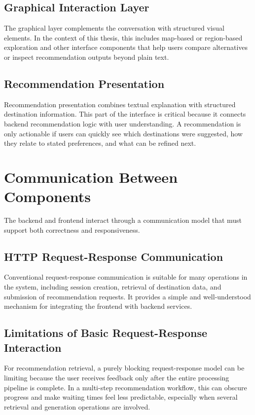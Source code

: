 \subsection{Graphical Interaction Layer}\label{subsection:system-architecture:graphical-layer}
The graphical layer complements the conversation with structured visual elements. In the context of this thesis, this includes map-based or region-based exploration and other interface components that help users compare alternatives or inspect recommendation outputs beyond plain text.

\subsection{Recommendation Presentation}\label{subsection:system-architecture:recommendation-presentation}
Recommendation presentation combines textual explanation with structured destination information. This part of the interface is critical because it connects backend recommendation logic with user understanding. A recommendation is only actionable if users can quickly see which destinations were suggested, how they relate to stated preferences, and what can be refined next.

\section{Communication Between Components}\label{section:system-architecture:communication}
The backend and frontend interact through a communication model that must support both correctness and responsiveness.

\subsection{HTTP Request-Response Communication}\label{subsection:system-architecture:http}
Conventional request-response communication is suitable for many operations in the system, including session creation, retrieval of destination data, and submission of recommendation requests. It provides a simple and well-understood mechanism for integrating the frontend with backend services.

\subsection{Limitations of Basic Request-Response Interaction}\label{subsection:system-architecture:request-response-limitations}
For recommendation retrieval, a purely blocking request-response model can be limiting because the user receives feedback only after the entire processing pipeline is complete. In a multi-step recommendation workflow, this can obscure progress and make waiting times feel less predictable, especially when several retrieval and generation operations are involved.

